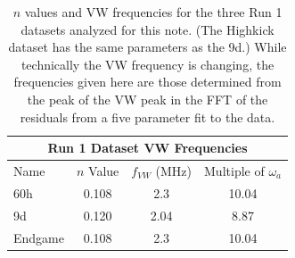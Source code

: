 \documentclass[12pt,letterpaper]{article}
\def\wa{$\omega_{a}$\xspace}
\begin{document}
\begin{table}[]
\centering
\setlength\tabcolsep{10pt}
\renewcommand{\arraystretch}{1.2}
\begin{tabular*}{.8\linewidth}{@{\extracolsep{\fill}}lccc}
  \hline
    \multicolumn{4}{c}{\textbf{Run 1 Dataset VW Frequencies}} \\
  \hline\hline
    Name & $n$ Value & $f_{VW}$ (MHz) & Multiple of \wa \\
  \hline
    60h &  0.108 & 2.3 & 10.04\\
    9d & 0.120 & 2.04 & 8.87 \\
    Endgame & 0.108 & 2.3 & 10.04 \\
  \hline
\end{tabular*}
\caption[Run 1 datasets]{$n$ values and VW frequencies for the three Run 1 datasets analyzed for this note. (The Highkick dataset has the same parameters as the 9d.) While technically the VW frequency is changing, the frequencies given here are those determined from the peak of the VW peak in the FFT of the residuals from a five parameter fit to the data.}
\label{tab:Run1Datasets}
\end{table}
\end{document}
